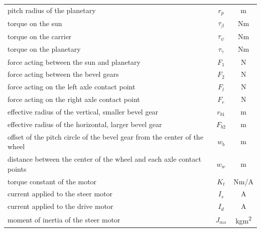 \documentclass{article}
\begin{document}
\begin{center}
\begin{tabular}{l c c}
        pitch radius of the planetary                                             & $r_p$         & m                      \\
        torque on the sun                                                         & $\tau_\beta$  & Nm                     \\
        torque on the carrier                                                     & $\tau_\psi$   & Nm                     \\
        torque on the planetary                                                   & $\tau_\gamma$ & Nm                     \\
        force acting between the sun and planetary                                & $F_1$         & N                      \\
        force acting between the bevel gears                                      & $F_2$         & N                      \\
        force acting on the left axle contact point                               & $F_l$         & N                      \\
        force acting on the right axle contact point                              & $F_r$         & N                      \\
        effective radius of the vertical, smaller bevel gear                      & $r_{b1}$      & m                      \\
        effective radius of the horizontal, larger bevel gear                     & $F_{b2}$      & m                      \\
        offset of the pitch circle of the bevel gear from the center of the wheel & $w_b$         & m                      \\
        distance between the center of the wheel and each axle contact points     & $w_w$         & m                      \\
        torque constant of the motor                                              & $K_t$         & Nm/A                   \\
        current applied to the steer motor                                        & $I_s$         & A                      \\
        current applied to the drive motor                                        & $I_d$         & A                      \\
        moment of inertia of the steer motor                                      & $J_{ms}$      & kgm\textsuperscript{2} \\

\end{tabular}
\end{center}
\end{document}
